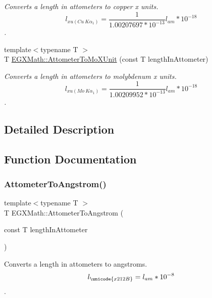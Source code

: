 \begin{DoxyCompactItemize}
\begin{DoxyCompactList}\small\item\em Converts a length in attometers to copper x units. \[ l_{xu(Cu\ K\alpha_1)}= \frac{1}{1.00207697*10^{-13}} l_{am} * 10^{-18} \]. \end{DoxyCompactList}\item 
{\footnotesize template$<$typename T $>$ }\\T \mbox{\hyperlink{group___e_g_x_math-_conversions-_length_conversions-_attometer-_non-_s_i_ga79ec6f4ec4a97af05fe8f69b80805ab7}{E\+G\+X\+Math\+::\+Attometer\+To\+Mo\+X\+Unit}} (const T length\+In\+Attometer)
\begin{DoxyCompactList}\small\item\em Converts a length in attometers to molybdenum x units. \[ l_{xu(Mo\ K\alpha_1)}=\frac{1}{1.00209952*10^{-13}} l_{am} * 10^{-18} \]. \end{DoxyCompactList}\end{DoxyCompactItemize}


\subsection{Detailed Description}


\subsection{Function Documentation}
\mbox{\label{group___e_g_x_math-_conversions-_length_conversions-_attometer-_non-_s_i_ga331ff6e8159f6f00bb7a20e39fa4d756}} 
\subsubsection{\texorpdfstring{Attometer\+To\+Angstrom()}{AttometerToAngstrom()}}
{\footnotesize\ttfamily template$<$typename T $>$ \\
T E\+G\+X\+Math\+::\+Attometer\+To\+Angstrom (\begin{DoxyParamCaption}\item[{const T}]{length\+In\+Attometer }\end{DoxyParamCaption})}



Converts a length in attometers to angstroms. \[ l_{\unicode{x212B}}=l_{am} * 10^{-8} \]. 

